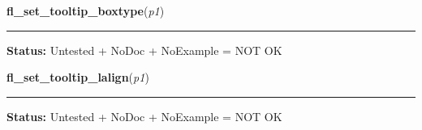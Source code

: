     \label{xformslib:library:fl_set_tooltip_boxtype}

    \vspace{0.5ex}

\hspace{.8\funcindent}\begin{boxedminipage}{\funcwidth}

    \raggedright \textbf{fl\_set\_tooltip\_boxtype}(\textit{p1})

    \vspace{-1.5ex}

    \rule{\textwidth}{0.5\fboxrule}
\setlength{\parskip}{2ex}
\setlength{\parskip}{1ex}
\textbf{Status:} Untested + NoDoc + NoExample = NOT OK



    \end{boxedminipage}

    \label{xformslib:library:fl_set_tooltip_lalign}

    \vspace{0.5ex}

\hspace{.8\funcindent}\begin{boxedminipage}{\funcwidth}

    \raggedright \textbf{fl\_set\_tooltip\_lalign}(\textit{p1})

    \vspace{-1.5ex}

    \rule{\textwidth}{0.5\fboxrule}
\setlength{\parskip}{2ex}
\setlength{\parskip}{1ex}
\textbf{Status:} Untested + NoDoc + NoExample = NOT OK



    \end{boxedminipage}

    \label{xformslib:library:fl_exe_command}

    \vspace{0.5ex}

